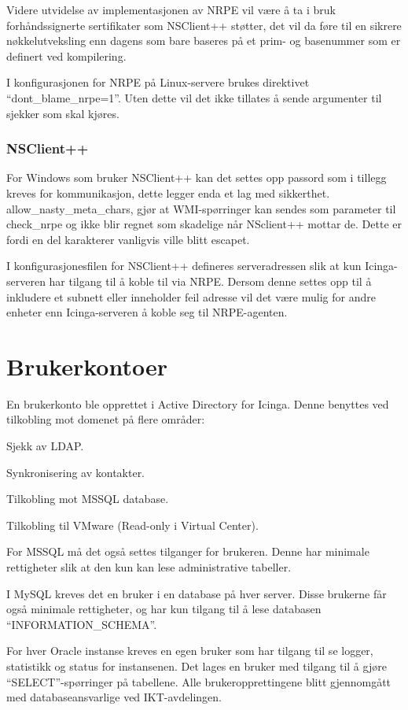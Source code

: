 Videre utvidelse av implementasjonen av NRPE vil være å ta i bruk forhåndssignerte sertifikater 
som NSClient++ støtter, det vil da føre til en sikrere nøkkelutveksling enn dagens som bare baseres på et prim- og basenummer som er definert ved kompilering.

I konfigurasjonen for NRPE på Linux-servere brukes direktivet ``dont\_blame\_nrpe=1''. Uten dette vil det ikke tillates å sende argumenter til sjekker som skal kjøres.
\subsubsection{NSClient++}
For Windows som bruker NSClient++ kan det settes opp passord som i tillegg kreves for kommunikasjon, dette legger enda et lag med sikkerthet.
allow\_nasty\_meta\_chars, gjør at WMI-spørringer kan sendes som parameter til check\_nrpe og ikke blir regnet som skadelige når NSclient++ mottar de. Dette er fordi en del karakterer vanligvis ville blitt escapet.

I konfigurasjonesfilen for NSClient++ defineres serveradressen slik at kun Icinga-serveren har tilgang til å koble til via NRPE. Dersom denne settes opp til å inkludere et subnett eller inneholder feil adresse vil det være mulig for andre enheter enn Icinga-serveren å koble seg til NRPE-agenten.

\section{Brukerkontoer}
En brukerkonto ble opprettet i Active Directory for Icinga. Denne benyttes ved tilkobling mot domenet på flere områder:
\begin{itemize*}
	\item Sjekk av LDAP.
	\item Synkronisering av kontakter.
	\item Tilkobling mot MSSQL database.
	\item Tilkobling til VMware (Read-only i Virtual Center).
\end{itemize*}
For MSSQL må det også settes tilganger for brukeren. Denne har minimale rettigheter slik at den kun kan lese administrative tabeller. 

I MySQL kreves det en bruker i en database på hver server. Disse brukerne får også minimale rettigheter, og har kun tilgang til å lese databasen ``INFORMATION\_SCHEMA''. 

For hver Oracle instanse kreves en egen bruker som har tilgang til se logger, statistikk og status for instansenen. Det lages en bruker med tilgang til å gjøre ``SELECT''-spørringer på tabellene.
Alle brukeropprettingene blitt gjennomgått med databaseansvarlige ved IKT-avdelingen. 

